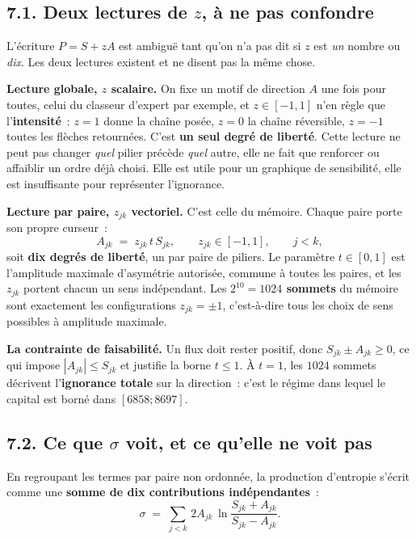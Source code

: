 \documentclass[11pt,a4paper]{article}
\begin{document}
\subsection*{7.1. Deux lectures de $z$, à ne pas confondre}

L'écriture $P=S+zA$ est ambiguë tant qu'on n'a pas dit si $z$ est \emph{un} nombre ou
\emph{dix}. Les deux lectures existent et ne disent pas la même chose.

\textbf{Lecture globale, $z$ scalaire.} On fixe un motif de direction $A$ une fois pour
toutes, celui du classeur d'expert par exemple, et $z\in[-1,1]$ n'en règle que
l'\textbf{intensité}~: $z=1$ donne la chaîne posée, $z=0$ la chaîne réversible, $z=-1$
toutes les flèches retournées. C'est \textbf{un seul degré de liberté}. Cette lecture ne
peut pas changer \emph{quel} pilier précède \emph{quel} autre, elle ne fait que renforcer ou
affaiblir un ordre déjà choisi. Elle est utile pour un graphique de sensibilité, elle est
insuffisante pour représenter l'ignorance.

\textbf{Lecture par paire, $z_{jk}$ vectoriel.} C'est celle du mémoire. Chaque paire porte
son propre curseur~:
\begin{equation}
  A_{jk}\;=\;z_{jk}\,t\,S_{jk},
  \qquad z_{jk}\in[-1,1],
  \qquad j<k,
  \label{eq:zpaire}
\end{equation}
soit \textbf{dix degrés de liberté}, un par paire de piliers. Le paramètre $t\in[0,1]$ est
l'amplitude maximale d'asymétrie autorisée, commune à toutes les paires, et les $z_{jk}$
portent chacun un sens indépendant. Les \textbf{$2^{10}=1024$ sommets} du mémoire sont
exactement les configurations $z_{jk}=\pm1$, c'est-à-dire tous les choix de sens possibles à
amplitude maximale.

\textbf{La contrainte de faisabilité.} Un flux doit rester positif, donc $S_{jk}\pm
A_{jk}\ge0$, ce qui impose $|A_{jk}|\le S_{jk}$ et justifie la borne $t\le1$. À $t=1$, les
$1024$ sommets décrivent l'\textbf{ignorance totale} sur la direction~: c'est le régime dans
lequel le capital est borné dans $[6858;8697]$.

\subsection*{7.2. Ce que $\sigma$ voit, et ce qu'elle ne voit pas}

En regroupant les termes par paire non ordonnée, la production d'entropie s'écrit comme une
\textbf{somme de dix contributions indépendantes}~:
\begin{equation}
  \sigma\;=\;\sum_{j<k}\,2A_{jk}\,
  \ln\!\frac{S_{jk}+A_{jk}}{S_{jk}-A_{jk}} .
  \label{eq:sigma-paires}
\end{equation}
\end{document}
